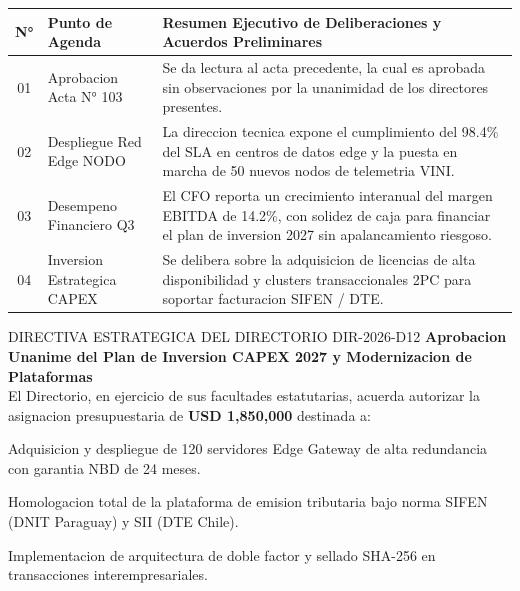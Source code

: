 \documentclass[11pt,a4paper]{article}
\begin{document}
\noindent
\begin{tabularx}{\linewidth}{@{} c p{4.0cm} X @{}}
  \toprule
  \rowcolor{corpPrimary}
  {\bfseries\color{white}\scriptsize N°} &
  {\bfseries\color{white}\scriptsize Punto de Agenda} &
  {\bfseries\color{white}\scriptsize Resumen Ejecutivo de Deliberaciones y Acuerdos Preliminares} \\
  \midrule
  \rowcolor{corpLightBg}
  01 & Aprobacion Acta N° 103 & Se da lectura al acta precedente, la cual es aprobada sin observaciones por la unanimidad de los directores presentes. \\
  02 & Despliegue Red Edge NODO & La direccion tecnica expone el cumplimiento del 98.4\% del SLA en centros de datos edge y la puesta en marcha de 50 nuevos nodos de telemetria VINI. \\
  \rowcolor{corpLightBg}
  03 & Desempeno Financiero Q3 & El CFO reporta un crecimiento interanual del margen EBITDA de 14.2\%, con solidez de caja para financiar el plan de inversion 2027 sin apalancamiento riesgoso. \\
  04 & Inversion Estrategica CAPEX & Se delibera sobre la adquisicion de licencias de alta disponibilidad y clusters transaccionales 2PC para soportar facturacion SIFEN / DTE. \\
  \bottomrule
\end{tabularx}

\clearpage

\drawchromaticbar[3.5pt]
\vspace{3mm}

\begin{corpdirective}{DIRECTIVA ESTRATEGICA DEL DIRECTORIO DIR-2026-D12}
  \textbf{Aprobacion Unanime del Plan de Inversion CAPEX 2027 y Modernizacion de Plataformas}\\
  El Directorio, en ejercicio de sus facultades estatutarias, acuerda autorizar la asignacion presupuestaria de \textbf{USD 1,850,000} destinada a:
  \begin{enumerate}[leftmargin=*, noitemsep, topsep=2pt]
    {\small
    \item Adquisicion y despliegue de 120 servidores Edge Gateway de alta redundancia con garantia NBD de 24 meses.
    \item Homologacion total de la plataforma de emision tributaria bajo norma SIFEN (DNIT Paraguay) y SII (DTE Chile).
    \item Implementacion de arquitectura de doble factor y sellado SHA-256 en transacciones interempresariales.}
  \end{enumerate}
\end{corpdirective}
\end{document}
